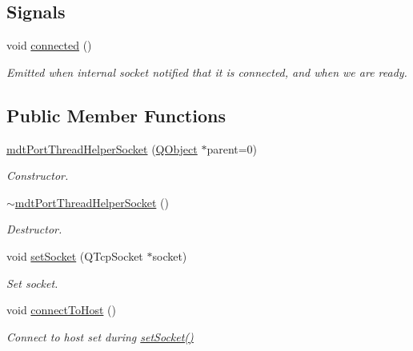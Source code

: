 \subsection*{Signals}
\begin{DoxyCompactItemize}
\item 
void \hyperlink{classmdt_port_thread_helper_socket_abd11bd8f13c7180389e8bf2249c643bf}{connected} ()
\begin{DoxyCompactList}\small\item\em Emitted when internal socket notified that it is connected, and when we are ready. \end{DoxyCompactList}\end{DoxyCompactItemize}
\subsection*{Public Member Functions}
\begin{DoxyCompactItemize}
\item 
\hyperlink{classmdt_port_thread_helper_socket_aa77afb8d26e4863bd437e0d59efae7a7}{mdt\-Port\-Thread\-Helper\-Socket} (\hyperlink{class_q_object}{Q\-Object} $\ast$parent=0)
\begin{DoxyCompactList}\small\item\em Constructor. \end{DoxyCompactList}\item 
\hyperlink{classmdt_port_thread_helper_socket_a7fee8df32e619eb76bf365785a8b95b4}{$\sim$mdt\-Port\-Thread\-Helper\-Socket} ()
\begin{DoxyCompactList}\small\item\em Destructor. \end{DoxyCompactList}\item 
void \hyperlink{classmdt_port_thread_helper_socket_ab8d22e337e1cc2e043683da8b8a034e5}{set\-Socket} (Q\-Tcp\-Socket $\ast$socket)
\begin{DoxyCompactList}\small\item\em Set socket. \end{DoxyCompactList}\item 
void \hyperlink{classmdt_port_thread_helper_socket_a1948457ffe9027edfe3fcf5c01e8d7e1}{connect\-To\-Host} ()
\begin{DoxyCompactList}\small\item\em Connect to host set during \hyperlink{classmdt_port_thread_helper_socket_ab8d22e337e1cc2e043683da8b8a034e5}{set\-Socket()} \end{DoxyCompactList}\end{DoxyCompactItemize}
